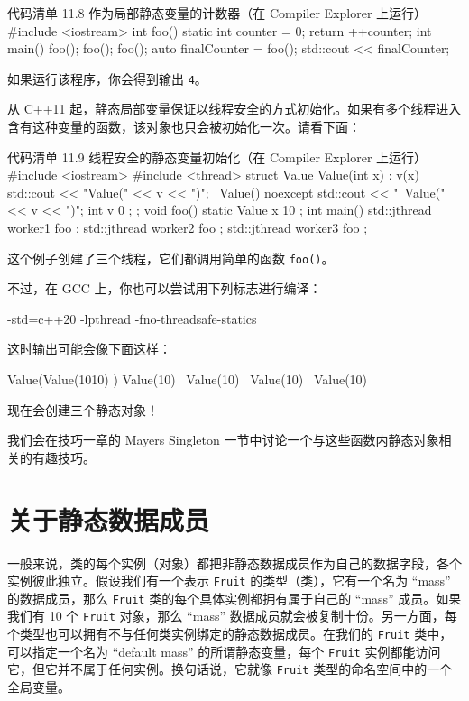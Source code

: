 \begin{codeboxt}[cpp]{代码清单 11.8 作为局部静态变量的计数器（在 Compiler Explorer 上运行）}
#include <iostream>
int foo() {
static int counter = 0;
return ++counter;
}
int main() {
foo();
foo();
foo();
auto finalCounter = foo();
std::cout << finalCounter;
}
\end{codeboxt}

如果运行该程序，你会得到输出 \texttt{4}。

从 C++11 起，静态局部变量保证以线程安全的方式初始化。如果有多个线程进入含有这种变量的函数，该对象也只会被初始化一次。请看下面：

\begin{codeboxt}[cpp]{代码清单 11.9 线程安全的静态变量初始化（在 Compiler Explorer 上运行）}
#include <iostream>
#include <thread>
struct Value {
Value(int x) : v(x) { std::cout << "Value(" << v << ")\n"; }
~Value() noexcept { std::cout << "~Value(" << v << ")\n"; }
int v { 0 };
};
void foo() {
static Value x { 10 };
}
int main() {
std::jthread worker1 { foo };
std::jthread worker2 { foo };
std::jthread worker3 { foo };
}
\end{codeboxt}

这个例子创建了三个线程，它们都调用简单的函数 \texttt{foo()}。

不过，在 GCC 上，你也可以尝试用下列标志进行编译：

\begin{codebox}[cpp]
-std=c++20 -lpthread -fno-threadsafe-statics
\end{codebox}

这时输出可能会像下面这样：

\begin{codebox}[cpp]
Value(Value(1010)
)
Value(10)
~Value(10)
~Value(10)
~Value(10)
\end{codebox}

现在会创建三个静态对象！

我们会在技巧一章的 Mayers Singleton 一节中讨论一个与这些函数内静态对象相关的有趣技巧。

\section{关于静态数据成员}

一般来说，类的每个实例（对象）都把非静态数据成员作为自己的数据字段，各个实例彼此独立。假设我们有一个表示 \texttt{Fruit} 的类型（类），它有一个名为 “mass” 的数据成员，那么 \texttt{Fruit} 类的每个具体实例都拥有属于自己的 “mass” 成员。如果我们有 10 个 \texttt{Fruit} 对象，那么 “mass” 数据成员就会被复制十份。另一方面，每个类型也可以拥有不与任何类实例绑定的静态数据成员。在我们的 \texttt{Fruit} 类中，可以指定一个名为 “default mass” 的所谓静态变量，每个 \texttt{Fruit} 实例都能访问它，但它并不属于任何实例。换句话说，它就像 \texttt{Fruit} 类型的命名空间中的一个全局变量。

